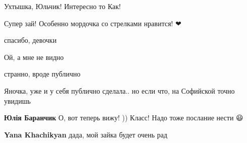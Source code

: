  
 
 
 
 

\qqSecCmt


Ухтышка, Юльчик! Интересно то Как!🤗🤗🤗😘💕


Супер зай! Особенно мордочка со стрелками нравится! ❤


спасибо, девочки 🙂


Ой, а мне не видно

\begin{itemize} %

странно, вроде публично


Яночка, уже и у себя публично сделала.. но если что, на Софийской точно увидишь 🙂

\textbf{Юлія Баранчик} О, вот теперь вижу! )) Класс! Надо тоже послание нести 😃

\textbf{Yana Khachikyan} дада, мой зайка будет очень рад 🙂
\end{itemize} %

